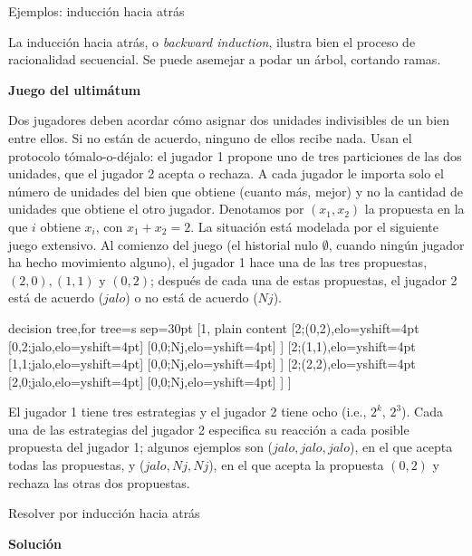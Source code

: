 \documentclass[12pt]{scrartcl}
\begin{document}
\begin{exbox}{Ejemplos: inducción hacia atrás}
	
	La inducción hacia atrás, o \textit{backward induction}, ilustra bien el proceso de racionalidad secuencial. Se puede asemejar a podar un árbol, cortando ramas. 
	    
	\tcbline
	    
	\textbf{Juego del ultimátum}
	    
	Dos jugadores deben acordar cómo asignar dos unidades indivisibles de un bien entre ellos. Si no están de acuerdo, ninguno de ellos recibe nada. Usan el protocolo tómalo-o-déjalo: el jugador 1 propone uno de tres particiones de las dos unidades, que el jugador 2 acepta o rechaza. A cada jugador le importa solo el número de unidades del bien que obtiene (cuanto más, mejor) y no la cantidad de unidades que obtiene el otro jugador.
	Denotamos por $(x_1, x_2)$ la propuesta en la que $i$ obtiene $x_i$, con $x_1 + x_2 = 2$. La situación está modelada por el siguiente juego extensivo. Al comienzo del juego (el historial nulo $\emptyset$, cuando ningún jugador ha hecho movimiento alguno), el jugador 1 hace una de las tres propuestas, $(2, 0), (1, 1) \text{ y } (0, 2)$; después de cada una de estas propuestas, el jugador 2 está de acuerdo ($jalo$) o no está de acuerdo ($Nj$).
	
	\begin{center}
		\footnotesize{
			\begin{forest} decision tree,for tree={s sep=30pt}
				[1, plain content
					[2;{(0,2)},elo={yshift=4pt}
						[{0,2};jalo,elo={yshift=4pt}]
						[{0,0};Nj,elo={yshift=4pt}]
					]
					[2;{(1,1)},elo={yshift=4pt}
						[{1,1};jalo,elo={yshift=4pt}]
						[{0,0};Nj,elo={yshift=4pt}]
					]
					[2;{(2,2)},elo={yshift=4pt}
						[{2,0};jalo,elo={yshift=4pt}]
						[{0,0};Nj,elo={yshift=4pt}]
					]
				]
			\end{forest}
		}
	\end{center}
	
	
	El jugador 1 tiene tres estrategias y el jugador 2 tiene ocho (i.e., $2^k$, $2^3$). Cada una de las estrategias del jugador 2 especifica su reacción a cada posible propuesta del jugador 1; algunos ejemplos son ($jalo, jalo, jalo$), en el que acepta todas las propuestas, y ($jalo, Nj, Nj$), en el que acepta la propuesta $(0, 2)$ y rechaza las otras dos propuestas.
	
	Resolver por inducción hacia atrás
	
	\textbf{Solución}
	

\end{exbox}
\end{document}

